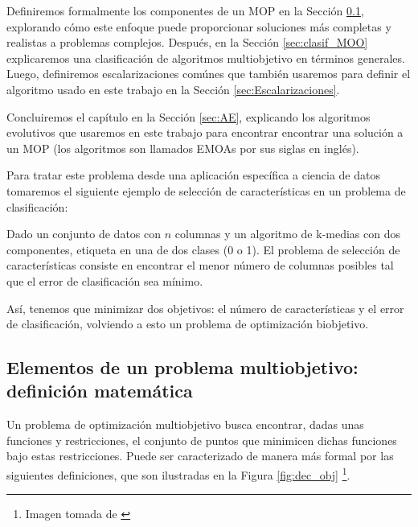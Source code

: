 Definiremos formalmente los componentes de un MOP en la Sección \ref{sec:Dominancia_Pareto}, explorando cómo este enfoque puede proporcionar soluciones más completas y realistas a problemas complejos. Después, en la Sección \ref{sec:clasif_MOO} explicaremos una clasificación de algoritmos multiobjetivo en términos generales. Luego, definiremos escalarizaciones comúnes que también usaremos para definir el algoritmo usado en este trabajo en la Sección \ref{sec:Escalarizaciones}.

Concluiremos el capítulo en la Sección \ref{sec:AE}, explicando los algoritmos evolutivos que usaremos en este trabajo para encontrar encontrar una solución a un MOP (los algoritmos son llamados EMOAs por sus siglas en inglés). 

Para tratar este problema desde una aplicación específica a ciencia de datos tomaremos el siguiente ejemplo de selección de características en un problema de clasificación:

\begin{texample} \label{ex:Selecc}
    Dado un conjunto de datos con $n$ columnas y un algoritmo de k-medias con dos componentes, etiqueta en una de dos clases (0 o 1). El problema de selección de características consiste en encontrar el menor número de columnas posibles tal que el error de clasificación sea mínimo.
    
    Así, tenemos que minimizar dos objetivos: el número de características y el error de clasificación, volviendo a esto un problema de optimización biobjetivo. 
\end{texample}


\subsection{Elementos de un problema multiobjetivo: definición matemática} \label{sec:Dominancia_Pareto}

Un problema de optimización multiobjetivo busca encontrar, dadas unas funciones y restricciones, el conjunto de puntos que minimicen dichas funciones bajo estas restricciones. Puede ser caracterizado de manera más formal por las siguientes definiciones, que son ilustradas en la Figura \ref{fig:dec_obj}  \footnote{Imagen tomada de \cite{coelloEvolutionaryAlgorithmsSolving}}. 

